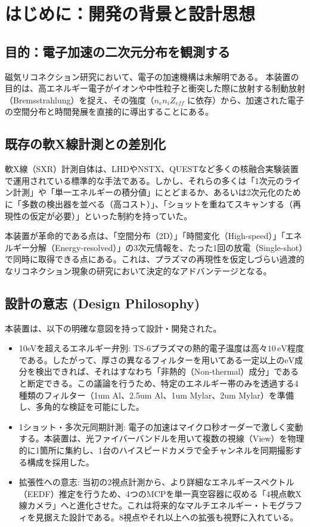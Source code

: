 \section{はじめに：開発の背景と設計思想}

\subsection{目的：電子加速の二次元分布を観測する}
磁気リコネクション研究において、電子の加速機構は未解明である。
本装置の目的は、高エネルギー電子がイオンや中性粒子と衝突した際に放射する制動放射（Bremsstrahlung）を捉え、その強度（$n_e n_i Z_{eff}$ に依存）から、加速された電子の空間分布と時間発展を直接的に導出することにある\cite{Takeda2023}。

\subsection{既存の軟X線計測との差別化}
軟X線（SXR）計測自体は、LHDやNSTX、QUESTなど多くの核融合実験装置で運用されている標準的な手法である。しかし、それらの多くは「1次元のライン計測」や「単一エネルギーの積分値」にとどまるか、あるいは2次元化のために「多数の検出器を並べる（高コスト）」、「ショットを重ねてスキャンする（再現性の仮定が必要）」といった制約を持っていた。

本装置が革命的である点は、「空間分布（2D）」「時間変化（High-speed）」「エネルギー分解（Energy-resolved）」の3次元情報を、たった1回の放電（Single-shot）で同時に取得できる点にある。これは、プラズマの再現性を仮定しづらい過渡的なリコネクション現象の研究において決定的なアドバンテージとなる。

\subsection{設計の意志 (Design Philosophy)}
本装置は、以下の明確な意図を持って設計・開発された。

\begin{itemize}
    \item 10eVを超えるエネルギー弁別:
    TS-6プラズマの熱的電子温度は高々$10\,\mathrm{eV}$程度である\cite{Takeda2023}。したがって、厚さの異なるフィルターを用いてある一定以上の$\mathrm{eV}$成分を検出できれば、それはすなわち「非熱的（Non-thermal）成分」であると断定できる。この議論を行うため、特定のエネルギー帯のみを透過する4種類のフィルター（1um Al、2.5um Al、1um Mylar、2um Mylar）を準備し、多角的な検証を可能にした。
    
    \item 1ショット・多次元同期計測:
    電子の加速はマイクロ秒オーダーで激しく変動する。本装置は、光ファイバーバンドルを用いて複数の視線（View）を物理的に1箇所に集約し、1台のハイスピードカメラで全チャンネルを同期撮影する構成を採用した。
    
    \item 拡張性への意志:
    当初の2視点計測から、より詳細なエネルギースペクトル（EEDF）推定を行うため、4つのMCPを単一真空容器に収める「4視点軟X線カメラ」へと進化させた\cite{Takeda2023}。これは将来的なマルチエネルギー・トモグラフィを見据えた設計である。8視点やそれ以上への拡張も視野に入れている。
\end{itemize}

